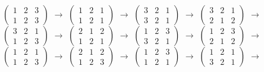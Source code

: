 \documentclass[12pt]{article}
\begin{document}
\noindent
 {\footnotesize$\left(\begin{array}{ccc} 1 & 2 & 3 \\ 1 & 2 & 3   \end{array}\right)$} $\rightarrow$
 {\footnotesize$\left(\begin{array}{ccc} 1 & 2 & 1 \\ 1 & 2 & 1   \end{array}\right)$} $\rightarrow$
 {\footnotesize$\left(\begin{array}{ccc} 3 & 2 & 1 \\ 3 & 2 & 1   \end{array}\right)$} $\rightarrow$
 {\footnotesize$\left(\begin{array}{ccc} 3 & 2 & 1 \\ 2 & 1 & 2   \end{array}\right)$} $\rightarrow$
 {\footnotesize$\left(\begin{array}{ccc} 3 & 2 & 1 \\ 1 & 2 & 3   \end{array}\right)$} $\rightarrow$
 {\footnotesize$\left(\begin{array}{ccc} 2 & 1 & 2 \\ 1 & 2 & 1   \end{array}\right)$} $\rightarrow$
 {\footnotesize$\left(\begin{array}{ccc} 1 & 2 & 3 \\ 3 & 2 & 1   \end{array}\right)$} $\rightarrow$
 {\footnotesize$\left(\begin{array}{ccc} 1 & 2 & 3 \\ 2 & 1 & 2   \end{array}\right)$} $\rightarrow$
{\footnotesize$\left(\begin{array}{ccc} 1 & 2 & 1 \\ 1 & 2 & 3   \end{array}\right)$} $\rightarrow$
{\footnotesize$\left(\begin{array}{ccc} 2 & 1 & 2 \\ 1 & 2 & 3   \end{array}\right)$} $\rightarrow$
{\footnotesize$\left(\begin{array}{ccc} 1 & 2 & 3 \\ 1 & 2 & 1   \end{array}\right)$} $\rightarrow$
{\footnotesize$\left(\begin{array}{ccc} 1 & 2 & 1 \\ 3 & 2 & 1   \end{array}\right)$} $\rightarrow$
\end{document}
